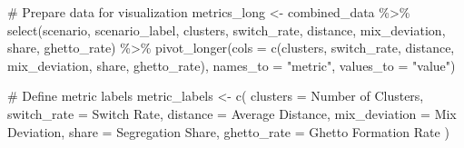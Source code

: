 \documentclass[
  11pt,
]{article}
\newenvironment{Shaded}{\begin{snugshade}}{\end{snugshade}}
\newcommand{\AttributeTok}[1]{\textcolor[rgb]{0.40,0.45,0.13}{#1}}
\newcommand{\CommentTok}[1]{\textcolor[rgb]{0.37,0.37,0.37}{#1}}
\newcommand{\FunctionTok}[1]{\textcolor[rgb]{0.28,0.35,0.67}{#1}}
\newcommand{\NormalTok}[1]{\textcolor[rgb]{0.00,0.23,0.31}{#1}}
\newcommand{\OtherTok}[1]{\textcolor[rgb]{0.00,0.23,0.31}{#1}}
\newcommand{\SpecialCharTok}[1]{\textcolor[rgb]{0.37,0.37,0.37}{#1}}
\newcommand{\StringTok}[1]{\textcolor[rgb]{0.13,0.47,0.30}{#1}}
\begin{document}
\begin{Shaded}
\begin{Highlighting}[]
\CommentTok{\# Prepare data for visualization}
\NormalTok{metrics\_long }\OtherTok{\textless{}{-}}\NormalTok{ combined\_data }\SpecialCharTok{\%\textgreater{}\%}
  \FunctionTok{select}\NormalTok{(scenario, scenario\_label, clusters, switch\_rate, distance, }
\NormalTok{         mix\_deviation, share, ghetto\_rate) }\SpecialCharTok{\%\textgreater{}\%}
  \FunctionTok{pivot\_longer}\NormalTok{(}\AttributeTok{cols =} \FunctionTok{c}\NormalTok{(clusters, switch\_rate, distance, mix\_deviation, share, ghetto\_rate),}
               \AttributeTok{names\_to =} \StringTok{"metric"}\NormalTok{, }\AttributeTok{values\_to =} \StringTok{"value"}\NormalTok{)}

\CommentTok{\# Define metric labels}
\NormalTok{metric\_labels }\OtherTok{\textless{}{-}} \FunctionTok{c}\NormalTok{(}
  \StringTok{\textquotesingle{}clusters\textquotesingle{}} \OtherTok{=} \StringTok{\textquotesingle{}Number of Clusters\textquotesingle{}}\NormalTok{,}
  \StringTok{\textquotesingle{}switch\_rate\textquotesingle{}} \OtherTok{=} \StringTok{\textquotesingle{}Switch Rate\textquotesingle{}}\NormalTok{,}
  \StringTok{\textquotesingle{}distance\textquotesingle{}} \OtherTok{=} \StringTok{\textquotesingle{}Average Distance\textquotesingle{}}\NormalTok{,}
  \StringTok{\textquotesingle{}mix\_deviation\textquotesingle{}} \OtherTok{=} \StringTok{\textquotesingle{}Mix Deviation\textquotesingle{}}\NormalTok{,}
  \StringTok{\textquotesingle{}share\textquotesingle{}} \OtherTok{=} \StringTok{\textquotesingle{}Segregation Share\textquotesingle{}}\NormalTok{,}
  \StringTok{\textquotesingle{}ghetto\_rate\textquotesingle{}} \OtherTok{=} \StringTok{\textquotesingle{}Ghetto Formation Rate\textquotesingle{}}
\NormalTok{)}


\end{Highlighting}
\end{Shaded}
\end{document}
